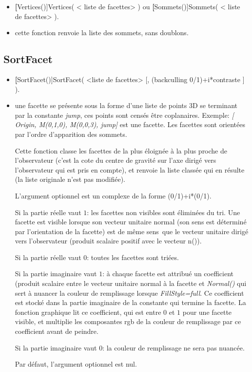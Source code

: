\begin{itemize}
 \item \util \textbf[Vertices()]{Vertices( < liste de facettes> )} ou \textbf[Sommets()]{Sommets( < liste de facettes> )}.
 \item \desc cette fonction renvoie la liste des sommets, sans doublons.
\end{itemize}

\subsection{SortFacet}\label{cmdSortFacet}

\begin{itemize}
 \item \util \textbf[SortFacet()]{SortFacet( <liste de facettes> [, (backculling 0/1)+i*contraste ] )}.
 \item \desc une facette se présente sous la forme d'une liste de points 3D se terminant par la constante \textit{jump}, ces points sont censés être coplanaires. Exemple: \textsl{[ Origin, M(0,1,0), M(0,0,3), jump]} est une facette. Les facettes sont orientées par l'ordre d'apparition des sommets.

 Cette fonction classe les facettes de la plus éloignée à la plus proche de l'observateur (c'est la cote du centre de gravité sur l'axe dirigé vers l'observateur qui est pris en compte), et renvoie la liste classée qui en résulte (la liste originale n'est pas modifiée).

 L'argument optionnel est un complexe de la forme (0/1)+i*(0/1).

 Si la partie réelle vaut $1$: les facettes non visibles sont éliminées du tri. Une facette est visible lorsque son vecteur unitaire normal (son sens est déterminé par l'orientation de la facette) est de \og même sens\fg\ que le vecteur unitaire dirigé vers l'observateur (produit scalaire positif avec le vecteur n()). 

 Si la partie réelle vaut $0$: toutes les facettes sont triées.

 Si la partie imaginaire vaut $1$: à chaque facette est attribué un coefficient (produit scalaire entre le vecteur unitaire normal à la facette et \textsl{Normal()} qui sert à nuancer la couleur de remplissage lorsque \textsl{FillStyle=full}. Ce coefficient est stocké dans la partie imaginaire de la constante \jump qui termine la facette. La fonction graphique  lit ce coefficient, qui est entre $0$ et $1$ pour une facette visible, et multiplie les composantes rgb de la couleur de remplissage par ce coefficient avant de peindre. 

 Si la partie imaginaire vaut $0$: la couleur de remplissage ne sera pas nuancée.

 Par défaut, l'argument optionnel est nul.
\end{itemize}


